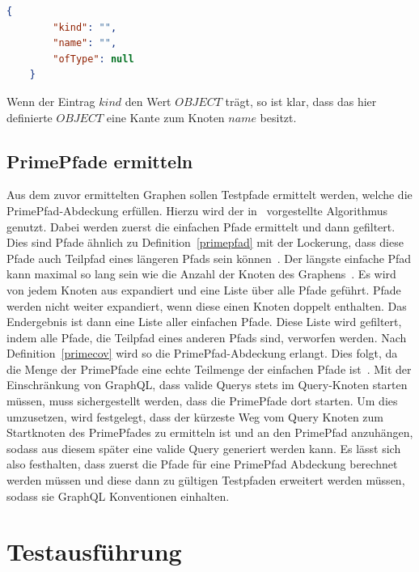\begin{lstlisting}[language=json, caption={Type-Field},captionpos=b, label={typefiel}]
    {
        "kind": "",
        "name": "",
        "ofType": null
    }
\end{lstlisting}

Wenn der Eintrag $kind$ den Wert $OBJECT$ trägt, so ist klar, dass das hier definierte $OBJECT$ eine Kante zum Knoten $name$ besitzt.

\subsection{PrimePfade ermitteln}
\label{testpfade}

Aus dem zuvor ermittelten Graphen sollen Testpfade ermittelt werden, welche die PrimePfad-Abdeckung erfüllen.
Hierzu wird der in~\cite[Finding Prime Test Paths]{software-testing} vorgestellte Algorithmus genutzt.
Dabei werden zuerst die einfachen Pfade ermittelt und dann gefiltert.
Dies sind Pfade ähnlich zu Definition~\ref{primepfad} mit der Lockerung, dass diese Pfade auch Teilpfad eines längeren Pfads sein können~\cite[vgl. S. 35]{software-testing}.
Der längste einfache Pfad kann maximal so lang sein wie die Anzahl der Knoten des Graphens~\cite[vgl. S.41 ]{software-testing}.
Es wird von jedem Knoten aus expandiert und eine Liste über alle Pfade geführt.
Pfade werden nicht weiter expandiert, wenn diese einen Knoten doppelt enthalten.
Das Endergebnis ist dann eine Liste aller einfachen Pfade.
Diese Liste wird gefiltert, indem alle Pfade, die Teilpfad eines anderen Pfads sind, verworfen werden.
Nach Definition~\ref{primecov} wird so die PrimePfad-Abdeckung erlangt.
Dies folgt, da die Menge der PrimePfade eine echte Teilmenge der einfachen Pfade ist~\cite[vgl. S. 35]{software-testing}.
Mit der Einschränkung von GraphQL, dass valide Querys stets im Query-Knoten starten müssen, muss sichergestellt werden, dass die PrimePfade dort starten.
Um dies umzusetzen, wird festgelegt, dass der kürzeste Weg vom Query Knoten zum Startknoten des PrimePfades zu ermitteln ist und an den PrimePfad anzuhängen,
sodass aus diesem später eine valide Query generiert werden kann.
Es lässt sich also festhalten, dass zuerst die Pfade für eine PrimePfad Abdeckung berechnet werden müssen
und diese dann zu gültigen Testpfaden erweitert werden müssen, sodass sie GraphQL Konventionen einhalten.

\newpage
\section{Testausführung}

